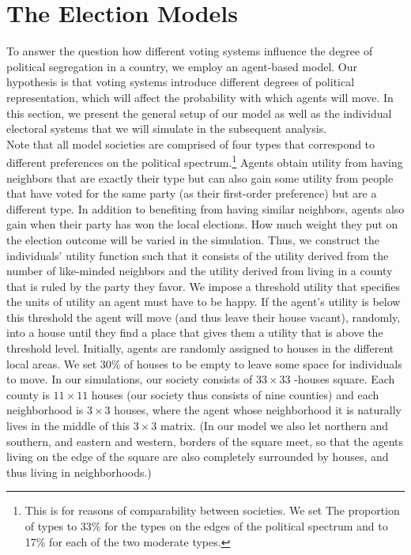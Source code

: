 \documentclass[12pt, a4paper]{article}
\begin{document}
\section{\label{model}The Election Models}
To answer the question how different voting systems influence the degree of political segregation in a country, we employ an agent-based model. Our hypothesis is that voting systems introduce different degrees of political representation, which will affect the probability with which agents will move. In this section, we present the general setup of our model as well as the individual electoral systems that we will simulate in the subsequent analysis.\\%
Note that all model societies are comprised of four types that correspond to different preferences on the political spectrum.\footnote{This is for reasons of comparability between societies. We set The proportion of types to 33\% for the types on the edges of the political spectrum and to 17\% for each of the two moderate types.} Agents obtain utility from having neighbors that are exactly their type but can also gain some utility from people that have voted for the same party (as their first-order preference) but are a different type. In addition to benefiting from having similar neighbors, agents also gain when their party has won the local elections. How much weight they put on the election outcome will be varied in the simulation.
Thus, we construct the individuals' utility function such that it consists of the utility derived from the number of like-minded neighbors and the utility derived from living in a county that is ruled by the party they favor.
We impose a threshold utility that specifies the units of utility an agent must have to be happy. If the agent's utility is below this threshold the agent will move (and thus leave their house vacant), randomly, into a house until they find a place that gives them a utility that is above the threshold level. Initially, agents are randomly assigned to houses in the different local areas. We set 30\% of houses to be empty to leave some space for individuals to move.
 In our simulations, our society consists of $33\times33$ -houses square. Each county is $11\times11$ houses (our society thus consists of nine counties) and each neighborhood is $3\times3$ houses, where the agent whose neighborhood it is naturally lives in the middle of this $3\times3$ matrix. (In our model we also let northern and southern, and eastern and western, borders of the square meet, so that the agents living on the edge of the square are also completely surrounded by houses, and thus living in neighborhoods.)
\end{document}

